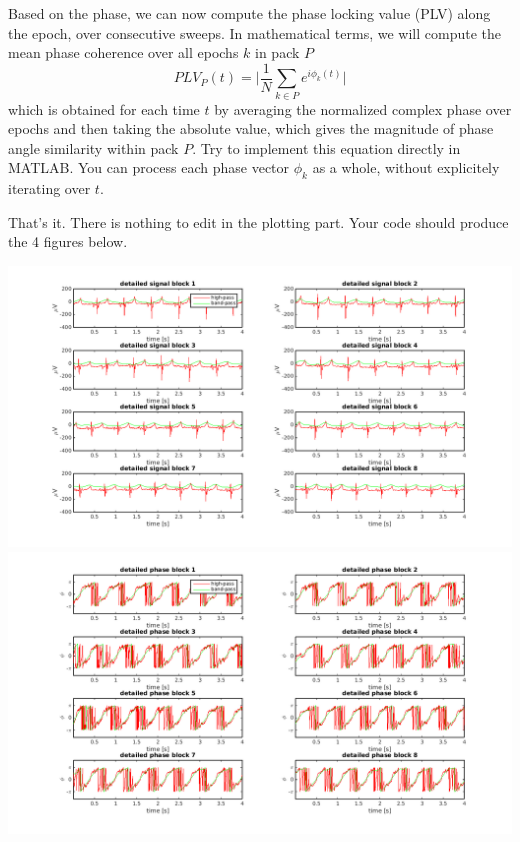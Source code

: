 \documentclass[10pt,a4paper,notitlepage]{report}
\begin{document}
Based on the phase, we can now compute the phase locking value (PLV) along the epoch, over consecutive sweeps. In mathematical terms, we will compute the mean phase coherence over all epochs $k$ in pack $P$
\begin{equation*}
PLV_P(t) = \lvert \frac{1}{N}\sum_{k\in P}e^{i\phi_k(t)} \rvert
\end{equation*}
which is obtained for each time $t$ by averaging the normalized complex phase over epochs and then taking the absolute value, which gives the magnitude of phase angle similarity within pack $P$. Try to implement this equation directly in MATLAB. You can process each phase vector $\phi_k$ as a whole, without explicitely iterating over $t$.

That's it. There is nothing to edit in the plotting part. Your code should produce the 4 figures below.

\vspace{1cm}
\hspace{-1cm} \includegraphics[scale=0.25]{p2fig7.png}
\includegraphics[scale=0.25]{p2fig8.png}
\end{document}
